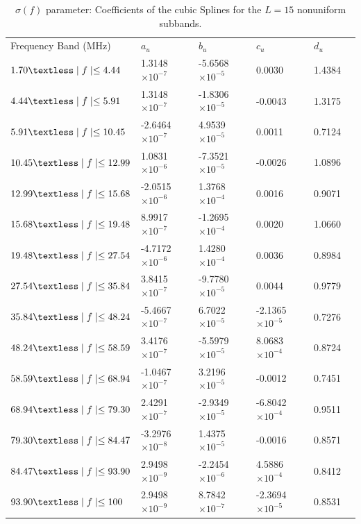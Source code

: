 \documentclass[journal]{IEEEtran}
\begin{document}
\begin{table}[h]
	\setlength\extrarowheight{4.5pt}
	\centering
	\caption{$\sigma(f)$ parameter: Coefficients of the cubic Splines for the $L=15$ nonuniform subbands.}
	\label{table_betalW}
	\begin{tabular}{|C{4cm}|C{2.7cm}|C{2.7cm}|C{2.7cm}|C{2.7cm}|m{0cm}}
		Frequency Band (MHz)           		   & $a_u$    			   	   & $b_u$      			  & $c_u$   		 		 & $d_u$ &\\ 
		$1.70\textless \mid f\mid \leq 4.44$   & 1.3148  $\times 10^{-7}$  & -5.6568 $\times 10^{-5}$ & 0.0030	 				 & 1.4384 &\\ 
		$4.44\textless \mid f\mid \leq 5.91$   & 1.3148  $\times 10^{-7}$  & -1.8306 $\times 10^{-5}$ & -0.0043  				 & 1.3175 &\\ 
		$5.91\textless \mid f\mid \leq 10.45$  & -2.6464 $\times 10^{-7}$  & 4.9539 $\times 10^{-5}$  & 0.0011					 & 0.7124 &\\ 
		$10.45\textless \mid f\mid \leq 12.99$ & 1.0831  $\times 10^{-6}$  & -7.3521 $\times 10^{-5}$ & -0.0026	 				 & 1.0896 &\\ 
		$12.99\textless \mid f\mid \leq 15.68$ & -2.0515 $\times 10^{-6}$  & 1.3768  $\times 10^{-4}$ & 0.0016  				 & 0.9071 &\\ 
		$15.68\textless \mid f\mid \leq 19.48$ & 8.9917 $\times 10^{-7}$   & -1.2695 $\times 10^{-4}$ & 0.0020	 				 & 1.0660 &\\ 
		$19.48\textless \mid f\mid \leq 27.54$ & -4.7172 $\times 10^{-6}$  & 1.4280 $\times 10^{-4}$  & 0.0036 					 & 0.8984 &\\ 
		$27.54\textless \mid f\mid \leq 35.84$ & 3.8415  $\times 10^{-7}$  & -9.7780 $\times 10^{-5}$ & 0.0044 					 & 0.9779 &\\ 
		$35.84\textless \mid f\mid \leq 48.24$ & -5.4667 $\times 10^{-7}$  & 6.7022 $\times 10^{-5}$  & -2.1365	$\times 10^{-5}$ & 0.7276 &\\ 
		$48.24\textless \mid f\mid \leq 58.59$ & 3.4176  $\times 10^{-7}$  & -5.5979 $\times 10^{-5}$ & 8.0683	$\times 10^{-4}$ & 0.8724 &\\ 
		$58.59\textless \mid f\mid \leq 68.94$ & -1.0467 $\times 10^{-7}$  & 3.2196 $\times 10^{-5}$  & -0.0012  				 & 0.7451 &\\ 
		$68.94\textless \mid f\mid \leq 79.30$ & 2.4291  $\times 10^{-7}$  & -2.9349 $\times 10^{-5}$ & -6.8042	$\times 10^{-4}$ & 0.9511 &\\ 
		$79.30\textless \mid f\mid \leq 84.47$ & -3.2976 $\times 10^{-8}$  & 1.4375 $\times 10^{-5}$  & -0.0016  				 & 0.8571 &\\ 
		$84.47\textless \mid f\mid \leq 93.90$ & 2.9498  $\times 10^{-9}$  & -2.2454 $\times 10^{-6}$ & 4.5886	$\times 10^{-4}$ & 0.8412 &\\ 
		$93.90\textless \mid f\mid \leq 100$   & 2.9498  $\times 10^{-9}$  & 8.7842 $\times 10^{-7}$  & -2.3694 $\times 10^{-5}$ & 0.8531 &\\ 
	\end{tabular}
\end{table}
\end{document}
